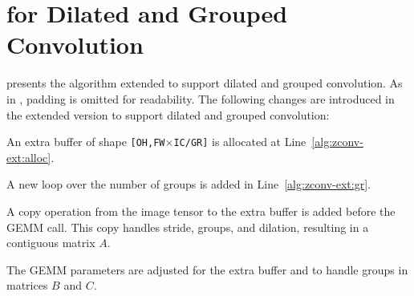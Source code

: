 \section{\algname for Dilated and Grouped Convolution}
\label{sec:zconv-alg-ext}

 presents the \algname algorithm extended to support dilated and grouped convolution.
As in , padding is omitted for readability.
The following changes are introduced in the extended version to support dilated and grouped convolution: 
\begin{enumerate*}[label=(\roman*)] 
    \item An extra buffer of shape \texttt{[OH,FW$\times$IC/GR]} is allocated at Line~\ref{alg:zconv-ext:alloc}.
    \item A new loop over the number of groups is added in Line~\ref{alg:zconv-ext:gr}. 
    \item A copy operation from the image tensor to the extra buffer is added before the GEMM call. 
    This copy handles stride, groups, and dilation, resulting in a contiguous matrix $A$.
    \item The GEMM parameters are adjusted for the extra buffer and to handle groups in matrices $B$ and $C$.
\end{enumerate*}

